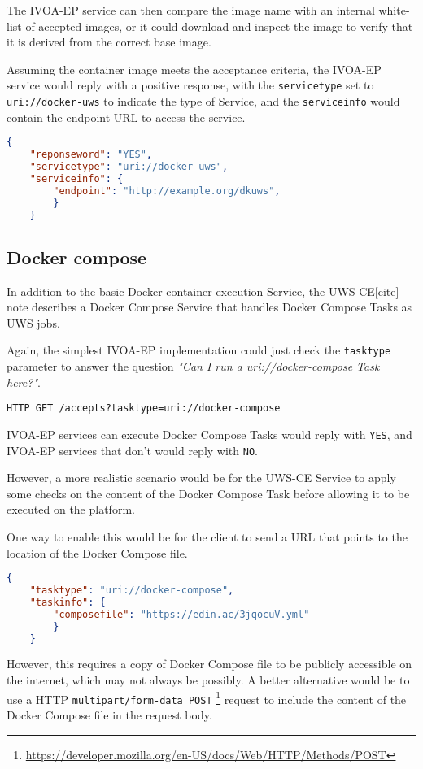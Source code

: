 \documentclass[11pt,a4paper]{ivoa}
\newcommand{\uws} {UWS\xspace}
\newcommand{\uwsce} {UWS-CE\xspace}
\newcommand{\ivoep} {IVOA-EP\xspace}
\newcommand{\docker} {Docker\xspace}
\newcommand{\dockercompose} {Docker Compose\xspace}
\newcommand{\codeword}[1] {\texttt{#1}}
\newcommand{\footurl}[1] {\footnote{\url{#1}}}
\begin{document}
The \ivoep service can then compare the image name with an internal white-list of accepted images, or it could download and inspect the image to verify that it is derived from the correct base image.

Assuming the container image meets the acceptance criteria, the \ivoep service would reply with a positive response, with the \codeword{servicetype} set to \codeword{uri://docker-uws} to indicate the type of Service, and the \codeword{serviceinfo} would contain the endpoint URL to access the service.
\begin{lstlisting}[language=json]
    {
    "reponseword": "YES",
    "servicetype": "uri://docker-uws",
    "serviceinfo": {
        "endpoint": "http://example.org/dkuws",
        }
    }
\end{lstlisting}

\subsection{Docker compose}
\label{sec:uri://docker-compose}

In addition to the basic \docker container execution Service, the \uwsce[cite] note describes a \dockercompose Service that handles \dockercompose Tasks as \uws jobs.

Again, the simplest \ivoep implementation could just check the \codeword{tasktype} parameter to answer the question \textit{"Can I run a uri://docker-compose Task here?"}.
\begin{lstlisting}[]
    HTTP GET /accepts?tasktype=uri://docker-compose
\end{lstlisting}
\ivoep services can execute \dockercompose Tasks would reply with \codeword{YES}, and \ivoep services that don't would reply with \codeword{NO}.

However, a more realistic scenario would be for the \uwsce Service to apply some checks on the content of the \dockercompose Task before allowing it to be executed on the platform.

One way to enable this would be for the client to send a URL that points to the location of the \dockercompose file.
\begin{lstlisting}[language=json]
    {
    "tasktype": "uri://docker-compose",
    "taskinfo": {
        "composefile": "https://edin.ac/3jqocuV.yml"
        }
    }
\end{lstlisting}
However, this requires a copy of \dockercompose file to be publicly accessible on the internet, which may not always be possibly. A better alternative would be to use a HTTP \codeword{multipart/form-data POST} \footurl{https://developer.mozilla.org/en-US/docs/Web/HTTP/Methods/POST} request to include the content of the \dockercompose file in the request body.
\end{document}
